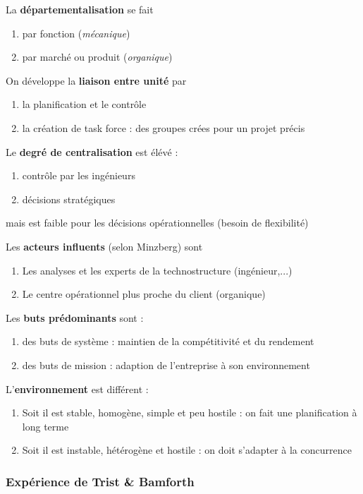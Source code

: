 \documentclass[12pt]{article}
\begin{document}
	La \textbf{départementalisation} se fait
	\begin{enumerate}
	 \item par fonction (\emph{mécanique})
	 \item par marché ou produit (\emph{organique})
	\end{enumerate}
	
	On développe la \textbf{liaison entre unité} par
	\begin{enumerate}
	 \item la planification et le contrôle
	 \item la création de \og{} task force\fg{} : des groupes crées pour un projet précis
	\end{enumerate}
	
	Le \textbf{degré de centralisation} est élévé :
	\begin{enumerate}
	 \item contrôle par les ingénieurs
	 \item décisions stratégiques
	\end{enumerate}
	mais est faible pour les décisions opérationnelles (besoin de flexibilité)
	
	Les \textbf{acteurs influents} (selon Minzberg) sont
	\begin{enumerate}
	 \item Les analyses et les experts de la technostructure (ingénieur,...)
	 \item Le centre opérationnel plus proche du client (organique)
	\end{enumerate}
	
	Les \textbf{buts prédominants} sont :
	\begin{enumerate}
	 \item des buts de système : maintien de la compétitivité et du rendement
	 \item des buts de mission : adaption de l'entreprise à son environnement
	\end{enumerate}
	
	L'\textbf{environnement} est différent :
	\begin{enumerate}
	 \item Soit il est stable, homogène, simple et peu hostile : on fait une planification à long terme
	 \item Soit il est instable, hétérogène et hostile : on doit s'adapter à la concurrence
	\end{enumerate}

	\subsubsection*{Expérience de Trist \& Bamforth}
	
\end{document}
